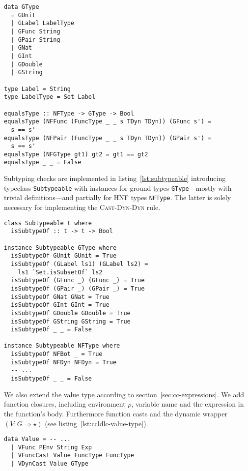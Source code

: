 \begin{lstlisting}[float,
  caption=Haskell: Ground type definition (\texttt{ProcessEnvironment.hs}),
  label=lst:gtype]
data GType
  = GUnit
  | GLabel LabelType
  | GFunc String
  | GPair String
  | GNat
  | GInt
  | GDouble
  | GString

type Label = String
type LabelType = Set Label

equalsType :: NFType -> GType -> Bool
equalsType (NFFunc (FuncType _ _ s TDyn TDyn)) (GFunc s') =
  s == s'
equalsType (NFPair (FuncType _ _ s TDyn TDyn)) (GPair s') =
  s == s'
equalsType (NFGType gt1) gt2 = gt1 == gt2
equalsType _ _ = False
\end{lstlisting}

Subtyping checks are implemented in listing~\ref{lst:subtypeable} introducing typeclass \texttt{Subtypeable} with instances for ground types \texttt{GType}---mostly with trivial definitions---and partially for HNF types \texttt{NFType}. The latter is solely necessary for implementing the \textsc{Cast-Dyn-Dyn} rule.

\begin{lstlisting}[float,
  label=lst:subtypeable,
  caption=Haskell: Subtypeable typeclass (\texttt{ProcessEnvironment.hs})]
class Subtypeable t where
  isSubtypeOf :: t -> t -> Bool

instance Subtypeable GType where
  isSubtypeOf GUnit GUnit = True
  isSubtypeOf (GLabel ls1) (GLabel ls2) =
    ls1 `Set.isSubsetOf` ls2
  isSubtypeOf (GFunc _) (GFunc _) = True
  isSubtypeOf (GPair _) (GPair _) = True
  isSubtypeOf GNat GNat = True
  isSubtypeOf GInt GInt = True
  isSubtypeOf GDouble GDouble = True
  isSubtypeOf GString GString = True
  isSubtypeOf _ _ = False

instance Subtypeable NFType where
  isSubtypeOf NFBot _ = True
  isSubtypeOf NFDyn NFDyn = True
  -- ...
  isSubtypeOf _ _ = False
\end{lstlisting}

We also extend the value type according to section~\ref{sec:cc-expressions}. We add function closures, including environment $\rho$, variable name and the expression in the function's body. Furthermore function casts and the dynamic wrapper $(V : G \Rightarrow \star)$ (see listing~\ref{lst:ccldlc-value-type}).

\begin{lstlisting}[float,
  label=lst:ccldlc-value-type,
  caption=Haskell: Value type extensions (\texttt{ProcessEnvironment.hs})]
data Value = -- ...
  | VFunc PEnv String Exp
  | VFuncCast Value FuncType FuncType
  | VDynCast Value GType
\end{lstlisting}

